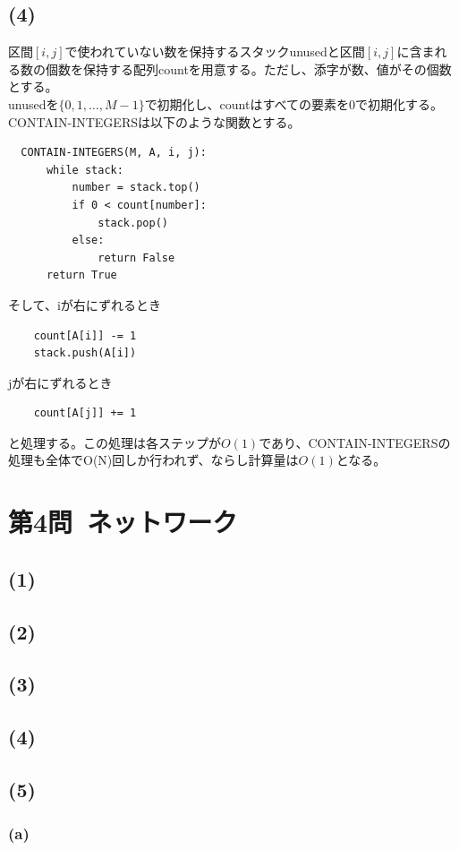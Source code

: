 \documentclass[a4paper,12pt,xelatex,ja=standard]{bxjsarticle}
\begin{document}
  \subsection*{(4)}
  区間$[i, j]$で使われていない数を保持するスタックunusedと区間$[i, j]$に含まれる数の個数を保持する配列countを用意する。ただし、添字が数、値がその個数とする。\\
  unusedを$\{0, 1, \dots, M-1\}$で初期化し、countはすべての要素を$0$で初期化する。\\
  CONTAIN-INTEGERSは以下のような関数とする。
  \begin{lstlisting}
  CONTAIN-INTEGERS(M, A, i, j):
      while stack:
          number = stack.top()
          if 0 < count[number]:
              stack.pop()
          else:
              return False
      return True
  \end{lstlisting}
  そして、iが右にずれるとき
  \begin{lstlisting}
    count[A[i]] -= 1
    stack.push(A[i])
  \end{lstlisting}
  jが右にずれるとき
  \begin{lstlisting}
    count[A[j]] += 1
  \end{lstlisting}
  と処理する。この処理は各ステップが$O(1)$であり、CONTAIN-INTEGERSの処理も全体でO(N)回しか行われず、ならし計算量は$O(1)$となる。

\section*{第4問\ ネットワーク}
  \subsection*{(1)}
  \subsection*{(2)}
  \subsection*{(3)}
  \subsection*{(4)}
  \subsection*{(5)}
    \subsubsection*{(a)}
\end{document}
